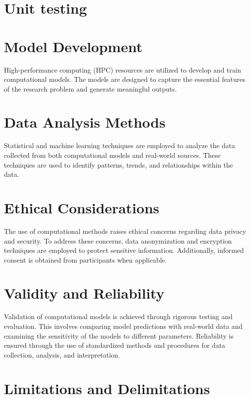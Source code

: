 \section{Unit testing}


\section{Model Development}

High-performance computing (HPC) resources are utilized to develop and train computational models. The models are designed to capture the essential features of the research problem and generate meaningful outputs.

\section{Data Analysis Methods}

Statistical and machine learning techniques are employed to analyze the data collected from both computational models and real-world sources. These techniques are used to identify patterns, trends, and relationships within the data.

\section{Ethical Considerations}

The use of computational methods raises ethical concerns regarding data privacy and security. To address these concerns, data anonymization and encryption techniques are employed to protect sensitive information. Additionally, informed consent is obtained from participants when applicable.

\section{Validity and Reliability}

Validation of computational models is achieved through rigorous testing and evaluation. This involves comparing model predictions with real-world data and examining the sensitivity of the models to different parameters. Reliability is ensured through the use of standardized methods and procedures for data collection, analysis, and interpretation.

\section{Limitations and Delimitations}

